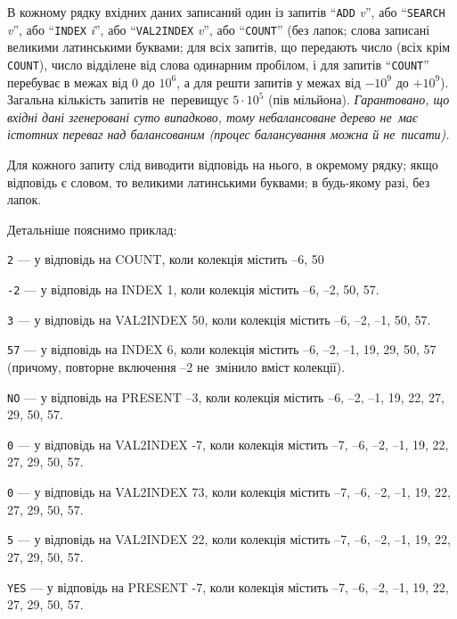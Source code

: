 \InputFile
В кожному рядку вхідних даних записаний один із запитів ``{\tt ADD} {\it v}'', або ``{\tt SEARCH} {\it v}'', або ``{\tt INDEX} {\it i}'', або ``{\tt VAL2INDEX} {\it v}'', або ``{\tt COUNT}'' (без лапок; слова записані великими латинськими буквами; для всіх запитів, що передають число (всіх крім {\tt COUNT}), число відділене від слова одинарним пробілом, і для запитів ``{\tt COUNT}'' перебуває в межах від 0 до $10^6$, а для решти запитів у межах від $-10^9$ до $+10^9$).
Загальна кількість запитів не~перевищує $5\cdot10^5$ (пів мільйона). 
{\it Гарантовано, що вхідні дані згенеровані суто випадково, тому небалансоване дерево не~має істотних переваг над балансованим (процес балансування можна й не~писати).}

\OutputFile
Для кожного запиту слід виводити відповідь на нього, в окремому рядку; якщо відповідь є словом, то великими латинськими буквами; в будь-якому разі, без лапок.

\Examples

\begin{example}
\end{example}

\Note
Детальніше пояснимо приклад:

{\tt 2} --- у відповідь на COUNT, коли колекція містить –6, 50

{\tt -2} --- у відповідь на INDEX 1, коли колекція містить –6, –2, 50, 57.

{\tt 3} --- у відповідь на VAL2INDEX 50, коли колекція містить –6, –2, –1, 50, 57.

{\tt 57} --- у відповідь на INDEX 6, коли колекція містить –6, –2, –1, 19, 29, 50, 57 (причому, повторне включення –2 не~змінило вміст колекції).

{\tt NO} --- у відповідь на PRESENT –3, коли колекція містить –6, –2, –1, 19, 22, 27, 29, 50, 57.

{\tt 0} --- у відповідь на VAL2INDEX -7, коли колекція містить –7, –6, –2, –1, 19, 22, 27, 29, 50, 57. 

{\tt 0} --- у відповідь на VAL2INDEX 73, коли колекція містить –7, –6, –2, –1, 19, 22, 27, 29, 50, 57. 

{\tt 5} --- у відповідь на VAL2INDEX 22, коли колекція містить –7, –6, –2, –1, 19, 22, 27, 29, 50, 57. 

{\tt YES} --- у відповідь на PRESENT -7, коли колекція містить –7, –6, –2, –1, 19, 22, 27, 29, 50, 57.
